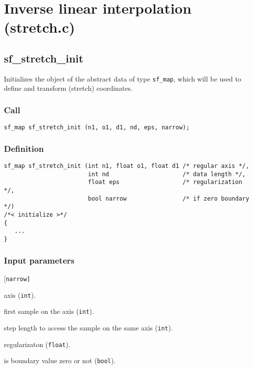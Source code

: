\section{Inverse linear interpolation (stretch.c)}




\subsection{{sf\_stretch\_init}}
Initializes the object of the abstract data of type \texttt{sf\_map}, which will be used to define and transform (stretch) coordinates.

\subsubsection*{Call}
\begin{verbatim}sf_map sf_stretch_init (n1, o1, d1, nd, eps, narrow);\end{verbatim}

\subsubsection*{Definition}
\begin{verbatim}
sf_map sf_stretch_init (int n1, float o1, float d1 /* regular axis */, 
                        int nd                     /* data length */, 
                        float eps                  /* regularization */, 
                        bool narrow                /* if zero boundary */)
/*< initialize >*/
{
   ...
}
\end{verbatim}

\subsubsection*{Input parameters}
\begin{desclist}{\tt }{\quad}[\tt narrow]
   \setlength\itemsep{0pt}
   \item[n1]	     axis (\texttt{int}).
   \item[o1]     first sample on the axis (\texttt{int}).
   \item[d1]     step length to access the sample on the same axis (\texttt{int}).
   \item[eps]    regularizaton (\texttt{float}). 
   \item[narrow] is boundary value zero or not (\texttt{bool}).
\end{desclist}

